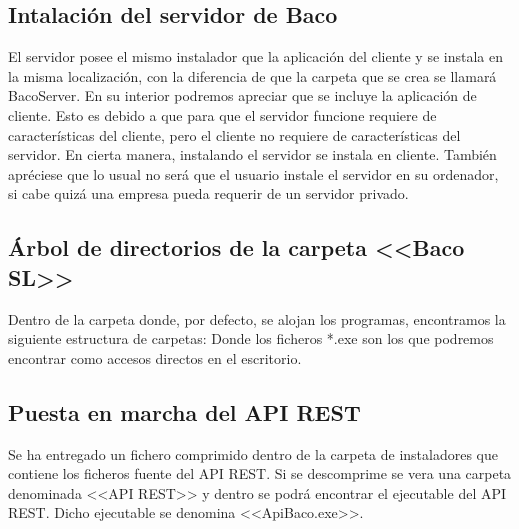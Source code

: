 \documentclass[12pt, a4paper]{book} %
\begin{document}
			\subsection{Intalación del servidor de Baco} \label{sbc:serverinstaller}
			El servidor posee el mismo instalador que la aplicación del cliente y se instala en la misma localización, con la diferencia de que la carpeta que se crea se llamará BacoServer. En su interior podremos apreciar que se incluye la aplicación de cliente. Esto es debido a que para que el servidor funcione requiere de características del cliente, pero el cliente no requiere de características del servidor. En cierta manera, instalando el servidor se instala en cliente. También apréciese que lo usual no será que el usuario instale el servidor en su ordenador, si cabe quizá una empresa pueda requerir de un servidor privado.
			\subsection{Árbol de directorios de la carpeta <<Baco SL>>}
			Dentro de la carpeta donde, por defecto, se alojan los programas, encontramos la siguiente estructura de carpetas:
			Donde los ficheros *.exe son los que podremos encontrar como accesos directos en el escritorio.
			\subsection{Puesta en marcha del API REST} \label{sbc:apirestexe}
			Se ha entregado un fichero comprimido dentro de la carpeta de instaladores que contiene los ficheros fuente del API REST. Si se descomprime se vera una carpeta denominada <<API REST>> y dentro se podrá encontrar el ejecutable del API REST. Dicho ejecutable se denomina <<ApiBaco.exe>>.
\end{document}
